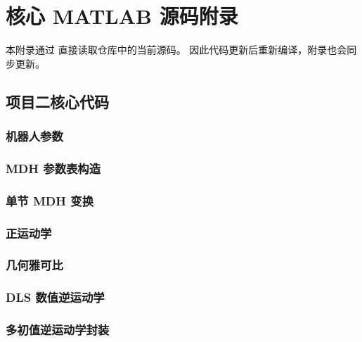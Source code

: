 \chapter{核心 MATLAB 源码附录}

本附录通过  直接读取仓库中的当前源码。
因此代码更新后重新编译，附录也会同步更新。

\section{项目二核心代码}

\subsection{机器人参数}


\subsection{MDH 参数表构造}


\subsection{单节 MDH 变换}


\subsection{正运动学}


\subsection{几何雅可比}


\subsection{DLS 数值逆运动学}


\subsection{多初值逆运动学封装}


